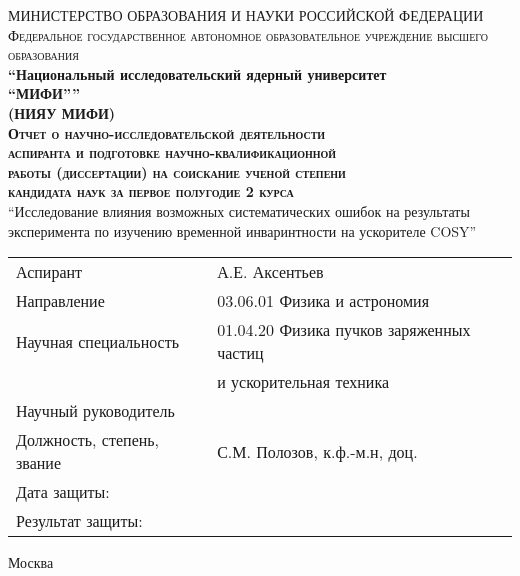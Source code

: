 \begin{titlepage}

\begin{center}
{МИНИСТЕРСТВО ОБРАЗОВАНИЯ И НАУКИ РОССИЙСКОЙ ФЕДЕРАЦИИ}\\[3pt]
\textsc{\small{Федеральное государственное автономное образовательное учреждение высшего образования}}\\

\textbf{\enquote{Национальный исследовательский ядерный университет\\
{``МИФИ''}}}\\
\textbf{(НИЯУ МИФИ)}\\[2cm]




\textsc{\textbf{Отчет о научно-исследовательской деятельности\\		
		аспиранта и подготовке научно-квалификационной\\	
		работы (диссертации) на соискание ученой степени\\		
		кандидата наук за первое полугодие 2 курса}}\\[2cm]

\enquote{Исследование влияния возможных систематических ошибок на результаты эксперимента по изучению временной инваринтности на ускорителе COSY}\\[2cm]


\end{center}


\begin{flushleft}
\begin{tabular}{ll}
Аспирант 						& А.Е. Аксентьев \\
Направление                     & 03.06.01 Физика и астрономия \\					
Научная специальность		   	& 01.04.20 Физика пучков заряженных частиц\\
								& \-\hspace{1.8cm} и ускорительная техника \\[1cm]
Научный руководитель 			& \\
Должность, степень, звание 		& С.М. Полозов, к.ф.-м.н, доц. \\[1cm]
Дата защиты:					& \\
Результат защиты:				& \\
\end{tabular}

\end{flushleft}

\vfill


\begin{center}
Москва \the\year{}
\end{center}



\end{titlepage}